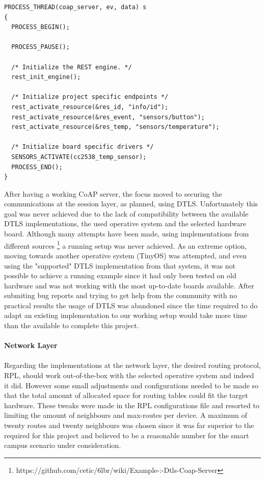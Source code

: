 \begin{lstlisting}
PROCESS_THREAD(coap_server, ev, data) s
{
  PROCESS_BEGIN();

  PROCESS_PAUSE();

  /* Initialize the REST engine. */
  rest_init_engine();

  /* Initialize project specific endpoints */
  rest_activate_resource(&res_id, "info/id");
  rest_activate_resource(&res_event, "sensors/button");
  rest_activate_resource(&res_temp, "sensors/temperature");

  /* Initialize board specific drivers */
  SENSORS_ACTIVATE(cc2538_temp_sensor);
  PROCESS_END();
}
\end{lstlisting}

After having a working \gls{CoAP} server, the focus moved to securing the communications at the session layer, as planned, using \gls{DTLS}. Unfortunately this goal was never achieved due to the lack of compatibility between the available \gls{DTLS} implementations, the used operative system and the selected hardware board. Although many attempts have been made, using implementations from different sources \footnote{https://github.com/cetic/6lbr/wiki/Example-:-Dtls-Coap-Server} a running setup was never achieved. As an extreme option, moving towards another operative system (TinyOS) was attempted, and even using the "supported" \gls{DTLS} implementation from that system, it was not possible to achieve a running example since it had only been tested on old hardware and was not working with the most up-to-date boards available. After submiting bug reports and trying to get help from the community with no practical results the usage of \gls{DTLS} was abandoned since the time required to do adapt an existing implementation to our working setup would take more time than the available to complete this project.

\paragraph{\textbf{Network Layer}}
\paragraph{}

Regarding the implementations at the network layer, the desired routing protocol, \gls{RPL}, should work out-of-the-box with the selected operative system and indeed it did. However some small adjustments and configurations needed to be made so that the total amount of allocated space for routing tables could fit the target hardware. These tweaks were made in the \gls{RPL} configurations file and resorted to limiting the amount of neighbours and max-routes per device. A maximum of twenty routes and twenty neighbours was chosen since it was far superior to the required for this project and believed to be a reasonable number for the smart campus scenario under consideration.

